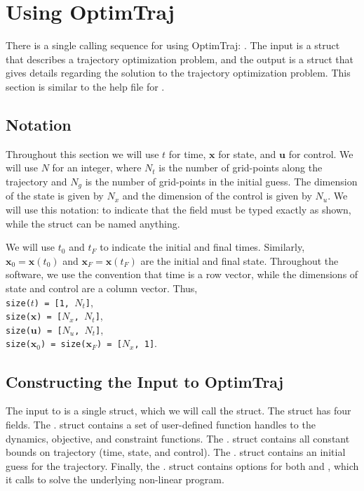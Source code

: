 \section{Using OptimTraj}

There is a single calling sequence for using OptimTraj:  . The input  is a struct that describes a trajectory optimization problem, and the output  is a struct that gives details regarding the solution to the trajectory optimization problem. This section is similar to the help file for .

\subsection{Notation}

Throughout this section we will use $t$ for time, $\bm{x}$ for state, and $\bm{u}$ for control. We will use $N$ for an integer, where $N_t$ is the number of grid-points along the trajectory and $N_g$ is the number of grid-points in the initial guess. The dimension of the state is given by $N_x$ and the dimension of the control is given by $N_u$. We will use this notation:  to indicate that the field  must be typed exactly as shown, while the struct  can be named anything.

\par We will use $t_0$ and $t_F$ to indicate the initial and final times. Similarly, $\bm{x}_0 = \bm{x}(t_0)$ and $\bm{x}_F = \bm{x}(t_F)$ are the initial and final state. Throughout the software, we use the convention that time is a row vector, while the dimensions of state and control are a column vector. Thus, \\
\texttt{size($t$) = [1, $N_t$]}, \\
\texttt{size($\bm{x}$) = [$N_x$, $N_t$]}, \\
\texttt{size($\bm{u}$) = [$N_u$, $N_t$]}, \\
\texttt{size($\bm{x}_0$) = size($\bm{x}_F$)  = [$N_x$, 1]}.


\subsection{Constructing the Input to OptimTraj}

The input to  is a single struct, which we will call the  struct. The  struct has four fields. The . struct contains a set of user-defined function handles to the dynamics, objective, and constraint functions. The . struct contains all constant bounds on trajectory (time, state, and control). The . struct contains an initial guess for the trajectory. Finally, the . struct contains options for both  and , which it calls to solve the underlying non-linear program.

